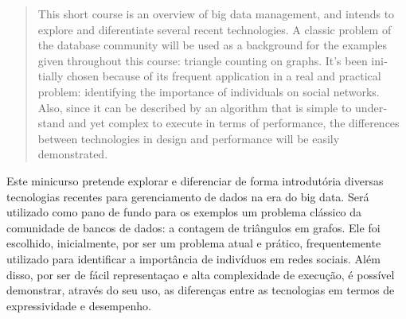 \begin{abstract}
\begin{otherlanguage}{english}
This short course is an overview of big data management, and
intends to explore and diferentiate several recent technologies. A
classic problem of the database community will be used as a background for the 
examples given throughout this course: triangle counting on graphs. It's been 
initially chosen because of its frequent application in a real and practical problem: 
identifying the importance of individuals on social networks. 
Also, since it can be described by an algorithm that is simple to understand and 
yet complex to execute in terms of performance, the differences between technologies
in design and performance will be easily demonstrated. 
\end{otherlanguage}
\end{abstract}

\begin{resumo}
Este minicurso pretende explorar e diferenciar de forma introdutória diversas 
tecnologias recentes
para gerenciamento de dados na era do big data. Será utilizado como pano de fundo para os
exemplos um problema clássico da comunidade de bancos de dados: a contagem de triângulos
em grafos. Ele foi escolhido, inicialmente, por ser um problema atual e prático, frequentemente 
utilizado para identificar a importância de indivíduos em redes sociais. Além disso, por ser de
fácil representaçao e alta complexidade de execução, é possível demonstrar, através do seu uso, 
as diferenças entre as tecnologias em termos de expressividade e desempenho. 
\end{resumo}

